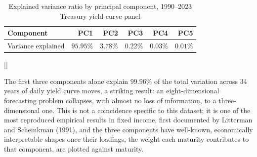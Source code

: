 \documentclass[../ai_in_finance]{subfiles}
\begin{document}
\begin{table}[htbp]
\centering
\begin{lrbox}{\bookmeasuredbox}
\begin{tabular}{lrrrrr}
\toprule
Component & PC1 & PC2 & PC3 & PC4 & PC5 \\
\midrule
Variance explained & $95.95\%$ & $3.78\%$ & $0.22\%$ & $0.03\%$ & $0.01\%$ \\
\bottomrule
\end{tabular}
\end{lrbox}
\ifdim\wd\bookmeasuredbox<0.65\linewidth
\setlength{\bookcapwidth}{0.65\linewidth}
\else
\setlength{\bookcapwidth}{\wd\bookmeasuredbox}
\fi
{}[\bookcapwidth]{
\usebox{\bookmeasuredbox}
}{
\caption{Explained variance ratio by principal component, 1990--2023 Treasury yield curve panel}
\label{tab:pca_variance}
}
\end{table}

The first three components alone explain $99.96\%$ of the total variation across 34 years of daily yield curve moves, a striking result: an eight-dimensional forecasting problem collapses, with almost no loss of information, to a three-dimensional one. This is not a coincidence specific to this dataset; it is one of the most reproduced empirical results in fixed income, first documented by Litterman and Scheinkman (1991), and the three components have well-known, economically interpretable shapes once their loadings, the weight each maturity contributes to that component, are plotted against maturity.
\end{document}

